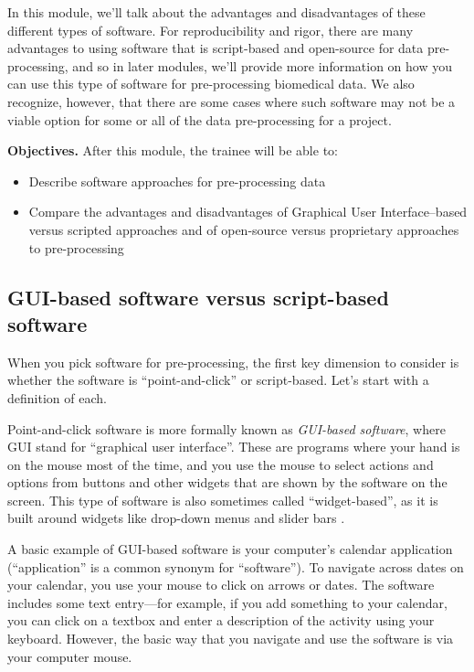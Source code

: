 \documentclass[]{tufte-book}
\providecommand{\tightlist}{%
  \setlength{\itemsep}{0pt}\setlength{\parskip}{0pt}}
\begin{document}
In this module, we'll talk about the advantages and disadvantages of these
different types of software. For reproducibility and rigor, there are many
advantages to using software that is script-based and open-source for data
pre-processing, and so in later modules, we'll provide more information on how
you can use this type of software for pre-processing biomedical data. We also
recognize, however, that there are some cases where such software may not be a
viable option for some or all of the data pre-processing for a project.

\textbf{Objectives.} After this module, the trainee will be able to:

\begin{itemize}
\tightlist
\item
  Describe software approaches for pre-processing data
\item
  Compare the advantages and disadvantages of Graphical User Interface--based
  versus scripted approaches and of open-source versus proprietary approaches
  to pre-processing
\end{itemize}

\subsection{GUI-based software versus script-based software}\label{gui-based-software-versus-script-based-software}

When you pick software for pre-processing, the first key dimension to consider
is whether the software is ``point-and-click'' or script-based.
Let's start with a definition of each.

Point-and-click software is more formally known as \emph{GUI-based software}, where
GUI stand for ``graphical user interface''. These are programs where your hand is
on the mouse most of the time, and you use the mouse to select actions and
options from buttons and other widgets that are shown by the software on the
screen. This type of software is also sometimes called ``widget-based'', as it is
built around widgets like drop-down menus and slider bars \citep{perkel2018future}.

A basic example of GUI-based software is your computer's calendar application
(``application'' is a common synonym for ``software''). To navigate across dates on
your calendar, you use your mouse to click on arrows or dates.
The software includes some text entry---for example, if you add something to
your calendar, you can click on a textbox and enter a description of the
activity using your keyboard. However, the basic way that you navigate and use
the software is via your computer mouse.
\end{document}
